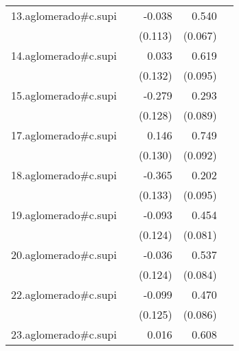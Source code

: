 {\begin{longtable}{l*{4}{D{.}{.}{-1}}}
\addlinespace
13.aglomerado#c.supi&                     &      -0.038         &       0.540\sym{***}&                     \\
            &                     &     (0.113)         &     (0.067)         &                     \\
\addlinespace
14.aglomerado#c.supi&                     &       0.033         &       0.619\sym{***}&                     \\
            &                     &     (0.132)         &     (0.095)         &                     \\
\addlinespace
15.aglomerado#c.supi&                     &      -0.279\sym{*}  &       0.293\sym{***}&                     \\
            &                     &     (0.128)         &     (0.089)         &                     \\
\addlinespace
17.aglomerado#c.supi&                     &       0.146         &       0.749\sym{***}&                     \\
            &                     &     (0.130)         &     (0.092)         &                     \\
\addlinespace
18.aglomerado#c.supi&                     &      -0.365\sym{**} &       0.202\sym{*}  &                     \\
            &                     &     (0.133)         &     (0.095)         &                     \\
\addlinespace
19.aglomerado#c.supi&                     &      -0.093         &       0.454\sym{***}&                     \\
            &                     &     (0.124)         &     (0.081)         &                     \\
\addlinespace
20.aglomerado#c.supi&                     &      -0.036         &       0.537\sym{***}&                     \\
            &                     &     (0.124)         &     (0.084)         &                     \\
\addlinespace
22.aglomerado#c.supi&                     &      -0.099         &       0.470\sym{***}&                     \\
            &                     &     (0.125)         &     (0.086)         &                     \\
\addlinespace
23.aglomerado#c.supi&                     &       0.016         &       0.608\sym{***}&                     \\

\end{longtable}}
